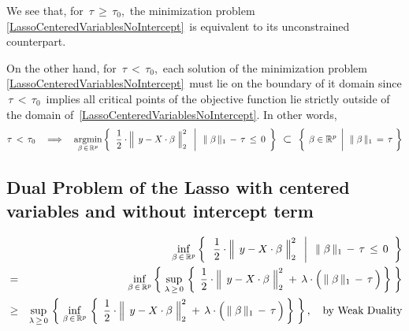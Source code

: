 \begin{itemize}
	\vskip 0.2cm
	We see that, for \,$\tau \,\geq\, \tau_{0}$,\, the minimization problem
	\,\eqref{LassoCenteredVariablesNoIntercept}\,
	is equivalent to its unconstrained counterpart.

	\vskip 0.2cm
	On the other hand, for \,$\tau \,<\, \tau_{0}$,\, each solution of the minimization problem
	\,\eqref{LassoCenteredVariablesNoIntercept}\,
	must lie on the boundary of it domain
	since \,$\tau \,<\, \tau_{0}$\, implies all critical points of the objective function lie strictly
	outside of the domain of \,\eqref{LassoCenteredVariablesNoIntercept}.
	In other words,
	{\color{red}\begin{equation*}
	\tau \,<\, \tau_{0}
	\quad\Longrightarrow\quad
		\underset{\beta\,\in\,\Re^{p}}{\argmin}
		\left\{\;\,
			\left.
			\dfrac{1}{2}
			\cdot
			\left\Vert\;\, y \overset{{\color{white}.}}{-} X\cdot\beta \;\right\Vert_{2}^{2}
			\;\;\,\right\vert\;\;
			\Vert\;\beta\,\Vert_{1} \, - \, \tau \, \leq \, 0
			\,\;\right\}
		\;\;\textnormal{\large$\subset$}\;\;
		\left\{\;
			\left.
			\overset{{\color{white}1}}{\beta} \in \Re^{p}
			\;\,\right\vert\;\,
			\Vert\;\beta\,\Vert_{1} \, = \, \tau
			\;\right\}
	\end{equation*}}
\end{itemize}


\subsection{Dual Problem of the Lasso with centered variables and without intercept term}
\vskip 0.0cm
\noindent
\begin{eqnarray*}
&&
	\underset{\beta\,\in\,\Re^{p}}{\inf}
	\left\{\;\;
		\left.
		\dfrac{1}{2}
		\cdot
		\left\Vert\;\, y \overset{{\color{white}.}}{-} X\cdot\beta \;\right\Vert_{2}^{2}
		\;\;\,\right\vert\;\;
		\Vert\;\beta\,\Vert_{1} \, - \, \tau \, \leq \, 0
		\;\;\right\}
\\
& = &
	\underset{\beta\,\in\,\Re^{p}}{\inf}
	\left\{\;
		\underset{\lambda\,\geq\,0}{\sup}\,
		\left\{\;\,
			\dfrac{1}{2}
			\cdot
			\left\Vert\;\, y \overset{{\color{white}.}}{-} X\cdot\beta \;\right\Vert_{2}^{2}
			\; + \,
			\lambda
			\cdot
			\left(\, \Vert\;\beta\,\Vert_{1} \, \overset{{\color{white}.}}{-} \, \tau \,\right)
			\,\right\}
		\;\right\}
\\
& \geq &
	\underset{\lambda\,\geq\,0}{\sup}\,
	\left\{\;
		\underset{\beta\,\in\,\Re^{p}}{\inf}\,
		\left\{\;\,
			\dfrac{1}{2}
			\cdot
			\left\Vert\;\, y \overset{{\color{white}.}}{-} X\cdot\beta \;\right\Vert_{2}^{2}
			\; + \,
			\lambda
			\cdot
			\left(\, \Vert\;\beta\,\Vert_{1} \, \overset{{\color{white}.}}{-} \, \tau \,\right)
			\,\right\}
		\;\right\},
	\quad
	\textnormal{by Weak Duality}
\end{eqnarray*}

